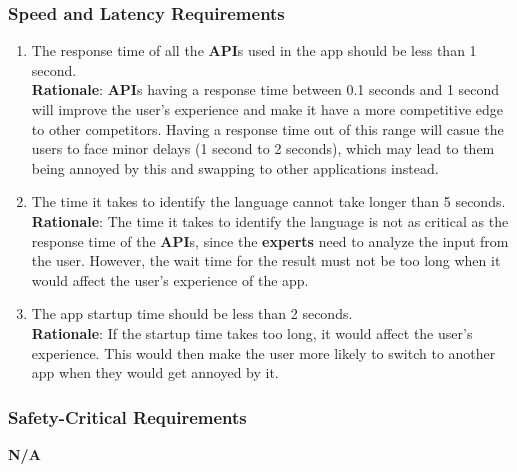 \subsubsection{Speed and Latency Requirements}
\label{ssub:speed_and_latency_requirements}
\begin{enumerate}[{PR-SL}1. ]
	\item The response time of all the \textbf{API}s used in the app should be less than 1 second.
	\\ \textbf{Rationale}: \textbf{API}s having a response time between 0.1 seconds and 1 second will improve the user's experience and make it have a more competitive edge to other competitors. Having a response time out of this range will casue the users to face minor delays (1 second to 2 seconds), which may lead to them being annoyed by this and swapping to other applications instead.
	\item The time it takes to identify the language cannot take longer than 5 seconds.
	\\ \textbf{Rationale}: The time it takes to identify the language is not as critical as the response time of the \textbf{API}s, since the \textbf{experts} need to analyze the input from the user. However, the wait time for the result must not be too long when it would affect the user's experience of the app.
	\item The app startup time should be less than 2 seconds.
	\\ \textbf{Rationale}: If the startup time takes too long, it would affect the user's experience. This would then make the user more likely to switch to another app when they would get annoyed by it.
\end{enumerate}


\subsubsection{Safety-Critical Requirements}
\label{ssub:safety_critical_requirements}
	\textbf{N/A}

